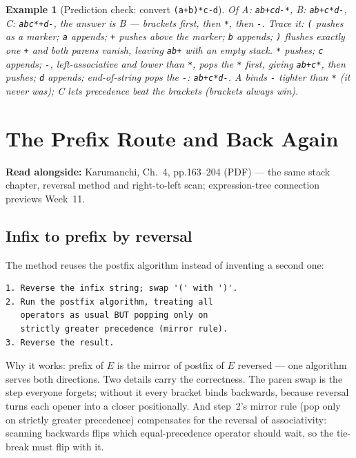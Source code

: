 \documentclass[11pt]{article}
\newtheorem{example}{Example}[section]
\begin{document}
\begin{example}[Prediction check: convert \texttt{(a+b)*c-d}]
Of A: \texttt{ab+cd-*}, B: \texttt{ab+c*d-}, C: \texttt{abc*+d-}, the answer is B --- brackets first, then \texttt{*}, then \texttt{-}. Trace it: \texttt{(} pushes as a marker; \texttt{a} appends; \texttt{+} pushes above the marker; \texttt{b} appends; \texttt{)} flushes exactly one \texttt{+} and both parens vanish, leaving \texttt{ab+} with an empty stack. \texttt{*} pushes; \texttt{c} appends; \texttt{-}, left-associative and lower than \texttt{*}, pops the \texttt{*} first, giving \texttt{ab+c*}, then pushes; \texttt{d} appends; end-of-string pops the \texttt{-}: \texttt{ab+c*d-}. A binds \texttt{-} tighter than \texttt{*} (it never was); C lets precedence beat the brackets (brackets always win).
\end{example}

\section{The Prefix Route and Back Again}

\textbf{Read alongside:} Karumanchi, Ch.~4, pp.163--204 (PDF) --- the same stack chapter, reversal method and right-to-left scan; expression-tree connection previews Week~11.

\subsection{Infix to prefix by reversal}

The method reuses the postfix algorithm instead of inventing a second one:
{\footnotesize
\begin{verbatim}
1. Reverse the infix string; swap '(' with ')'.
2. Run the postfix algorithm, treating all
   operators as usual BUT popping only on
   strictly greater precedence (mirror rule).
3. Reverse the result.
\end{verbatim}
}
Why it works: prefix of $E$ is the mirror of postfix of $E$ reversed --- one algorithm serves both directions. Two details carry the correctness. The paren swap is the step everyone forgets; without it every bracket binds backwards, because reversal turns each opener into a closer positionally. And step~2's mirror rule (pop only on strictly greater precedence) compensates for the reversal of associativity: scanning backwards flips which equal-precedence operator should wait, so the tie-break must flip with it.
\end{document}
